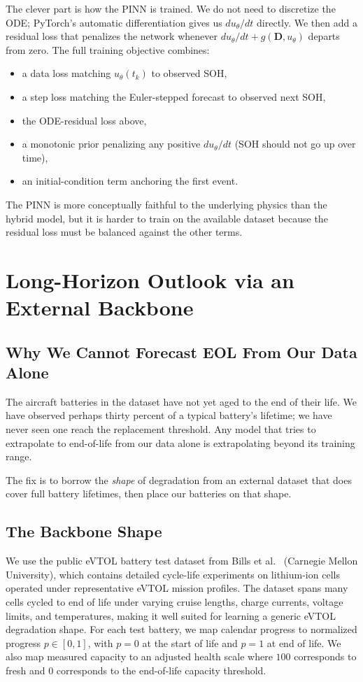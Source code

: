 \documentclass[11pt]{article}
\begin{document}
The clever part is how the PINN is trained. We do not need to discretize
the ODE; PyTorch's automatic differentiation gives us
\(du_\theta/dt\) directly. We then add a residual loss that penalizes
the network whenever
\(du_\theta/dt + g(\mathbf{D}, u_\theta)\) departs from zero. The full
training objective combines:
\begin{itemize}[leftmargin=*]
    \item a data loss matching \(u_\theta(t_k)\) to observed SOH,
    \item a step loss matching the Euler-stepped forecast to observed
    next SOH,
    \item the ODE-residual loss above,
    \item a monotonic prior penalizing any positive
    \(du_\theta/dt\) (SOH should not go up over time),
    \item an initial-condition term anchoring the first event.
\end{itemize}
The PINN is more conceptually faithful to the underlying physics than
the hybrid model, but it is harder to train on the available dataset
because the residual loss must be balanced against the other terms.

\section{Long-Horizon Outlook via an External Backbone}

\subsection{Why We Cannot Forecast EOL From Our Data Alone}

The aircraft batteries in the dataset have not yet aged to the end of
their life. We have observed perhaps thirty percent of a typical
battery's lifetime; we have never seen one reach the replacement
threshold. Any model that tries to extrapolate to end-of-life from our
data alone is extrapolating beyond its training range.

The fix is to borrow the \emph{shape} of degradation from an external
dataset that does cover full battery lifetimes, then place our
batteries on that shape.

\subsection{The Backbone Shape}

We use the public eVTOL battery test dataset from Bills et
al.~\cite{bills2023evtol} (Carnegie Mellon University), which contains
detailed cycle-life experiments on lithium-ion cells operated under
representative eVTOL mission profiles. The dataset spans many cells
cycled to end of life under varying cruise lengths, charge currents,
voltage limits, and temperatures, making it well suited for learning a
generic eVTOL degradation shape. For each test battery, we map calendar
progress to normalized progress \(p \in [0,1]\), with \(p = 0\) at the
start of life and \(p = 1\) at end of life. We also map measured capacity to an
adjusted health scale where \(100\) corresponds to fresh and \(0\)
corresponds to the end-of-life capacity threshold.
\end{document}
